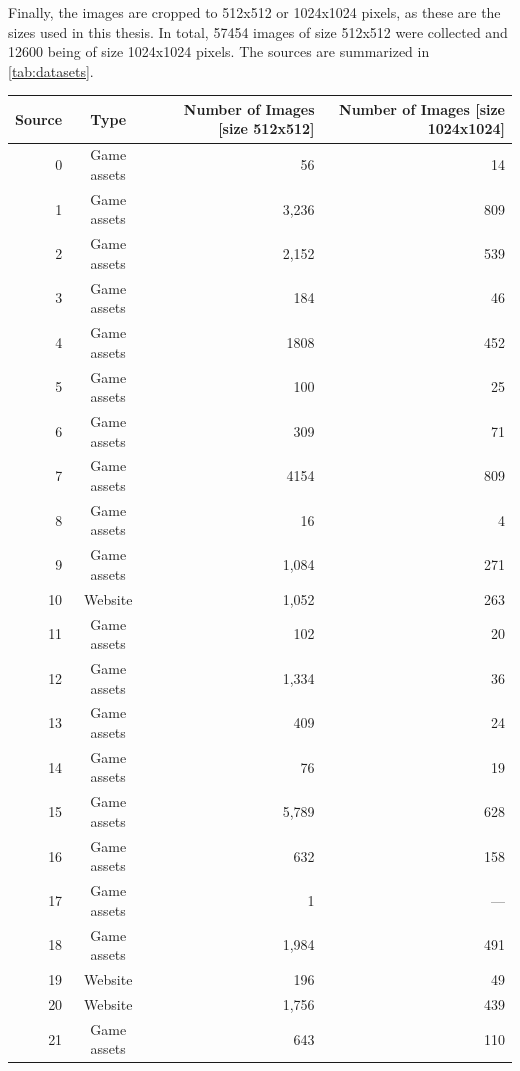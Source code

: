     Finally, the images are cropped to 512x512 or 1024x1024 pixels, as these are the sizes used in this thesis. In total, 57454 images of size 512x512 were collected and 12600 being of size 1024x1024 pixels. The sources are summarized in \autoref{tab:datasets}.

    \begin{table}[H]
        \centering
        \begin{adjustbox}{width=0.8\textwidth}
          \begin{tabular}{|r|c|r|r|}
              \hline
              Source & Type & Number of Images [size 512x512] & Number of Images [size 1024x1024] \\
              \hline
              0 & Game assets & 56 & 14 \\
              1 & Game assets & 3,236 & 809 \\
              2 & Game assets & 2,152 & 539 \\
              3 & Game assets & 184 & 46 \\
              4 & Game assets & 1808 & 452 \\
              5 & Game assets & 100 & 25 \\
              6 & Game assets & 309 & 71 \\
              7 & Game assets & 4154 & 809 \\
              8 & Game assets & 16 & 4 \\
              9 & Game assets & 1,084 & 271 \\
              10 & Website & 1,052 & 263 \\
              11 & Game assets & 102 & 20 \\
              12 & Game assets & 1,334 & 36 \\
              13 & Game assets & 409 & 24 \\
              14 & Game assets & 76 & 19 \\
              15 & Game assets & 5,789 & 628 \\
              16 & Game assets & 632 & 158 \\
              17 & Game assets & 1 & --- \\
              18 & Game assets & 1,984 & 491 \\
              19 & Website & 196 & 49 \\
              20 & Website & 1,756 & 439 \\
              21 & Game assets & 643 & 110 \\

\end{tabular}
\end{adjustbox}
\end{table}
